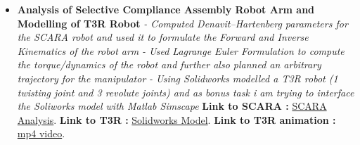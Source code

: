 \documentclass[a4paper,12pt]{article}
\begin{document}
\begin{itemize}
    \item{\textbf{\large{Analysis of Selective Compliance Assembly Robot Arm and Modelling of T3R Robot}}
          \newline
          \textit{- Computed Denavit–Hartenberg parameters for the SCARA robot and used it to formulate the Forward and Inverse Kinematics of the robot arm}
          \newline
          \textit{- Used Lagrange Euler Formulation to compute the torque/dynamics of the robot and further also planned an arbitrary trajectory for the manipulator}
          \newline
          \textit{- Using Solidworks modelled a T3R robot (1 twisting joint and 3 revolute joints) and as bonus task i am trying to interface the Soliworks model with Matlab Simscape}}
          \newline
          \textbf{ Link to SCARA :} \href{https://github.com/teetangh/Robotics-Projects/blob/master/SCARA_Robot_Analysis.pdf}{SCARA Analysis}.
          \newline
          \textbf{ Link to T3R :} \href{https://github.com/teetangh/Robotics-Projects/tree/master/T3R%20Robot}{Solidworks Model}.
          \textbf{ Link to T3R animation :} \href{https://github.com/teetangh/Robotics-Projects/blob/master/T3R%20Robot/Resources/T3R%20Animation.mp4}{mp4 video}.
          \newline

\end{itemize}

\newpage
\end{document}
